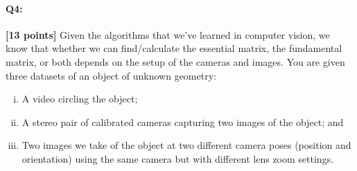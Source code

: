 





\pagebreak
\paragraph{Q4:} \textbf{[13 points]}
Given the algorithms that we've learned in computer vision, we know that whether we can find/calculate the essential matrix, the fundamental matrix, or both depends on the setup of the cameras and images. You are given three datasets of an object of unknown geometry:

\begin{enumerate}[(i)]
\item A video circling the object;
\item A stereo pair of calibrated cameras capturing two images of the object; and
\item Two images we take of the object at two different camera poses (position and orientation) using the same camera but with different lens zoom settings.
\end{enumerate}

